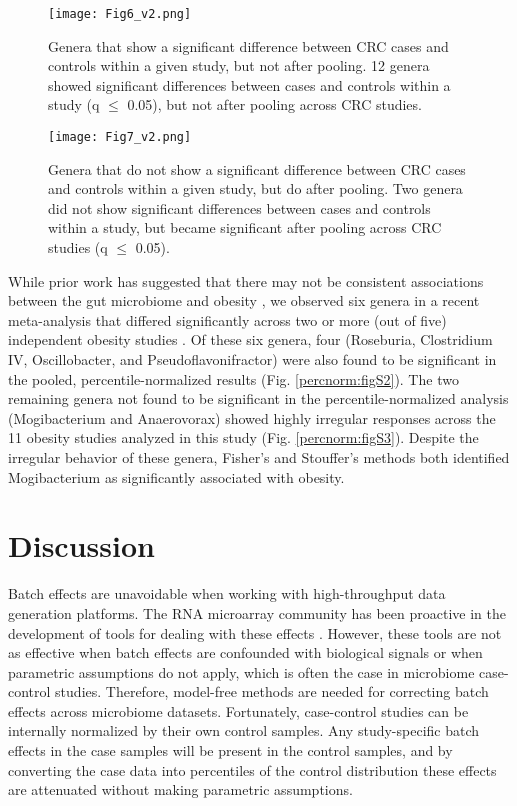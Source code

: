 \begin{figure}[h]
\begin{center}
    \texttt{[image: Fig6\_v2.png]}
    \caption{Genera that show a significant difference between CRC cases and controls within a given study, but not after pooling. 12 genera showed significant differences between cases and controls within a study (q $\leq$ 0.05), but not after pooling across CRC studies.}\label{percnorm:fig6}
\end{center}
\end{figure}

\begin{figure}[h]
\begin{center}
    \texttt{[image: Fig7\_v2.png]}
    \caption{Genera that do not show a significant difference between CRC cases and controls within a given study, but do after pooling. Two genera did not show significant differences between cases and controls within a study, but became significant after pooling across CRC studies (q $\leq$ 0.05).}\label{percnorm:fig7}
\end{center}
\end{figure}

While prior work has suggested that there may not be consistent associations between the gut microbiome and obesity \cite{35}, we observed six genera in a recent meta-analysis that differed significantly across two or more (out of five) independent obesity studies \cite{17}.
Of these six genera, four (Roseburia, Clostridium IV, Oscillobacter, and Pseudoflavonifractor) were also found to be significant in the pooled, percentile-normalized results (Fig. \ref{percnorm:figS2}).
The two remaining genera not found to be significant in the percentile-normalized analysis (Mogibacterium and Anaerovorax) showed highly irregular responses across the 11 obesity studies analyzed in this study (Fig. \ref{percnorm:figS3}).
Despite the irregular behavior of these genera, Fisher's and Stouffer's methods both identified Mogibacterium as significantly associated with obesity.

\section{Discussion}

Batch effects are unavoidable when working with high-throughput data generation platforms.
The RNA microarray community has been proactive in the development of tools for dealing with these effects \cite{1,8}.
However, these tools are not as effective when batch effects are confounded with biological signals or when parametric assumptions do not apply, which is often the case in microbiome case-control studies.
Therefore, model-free methods are needed for correcting batch effects across microbiome datasets.
Fortunately, case-control studies can be internally normalized by their own control samples.
Any study-specific batch effects in the case samples will be present in the control samples, and by converting the case data into percentiles of the control distribution these effects are attenuated without making parametric assumptions.

